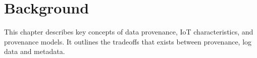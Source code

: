 \chapter{Background}

This chapter describes key concepts of data provenance, IoT characteristics, and provenance models. It outlines the tradeoffs that exists between provenance, log data and metadata. 

%
%
%
%

